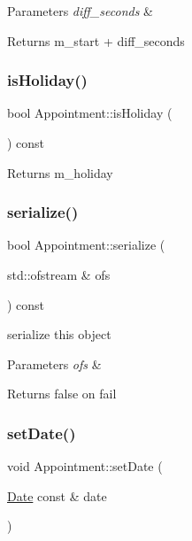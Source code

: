 \begin{DoxyParams}{Parameters}
{\em diff\+\_\+seconds} & \\
\hline
\end{DoxyParams}
\begin{DoxyReturn}{Returns}
m\+\_\+start + diff\+\_\+seconds 
\end{DoxyReturn}
\mbox{\label{classAppointment_a0307e814d106ba2b2314a28a9701efae}} 
\subsubsection{\texorpdfstring{is\+Holiday()}{isHoliday()}}
{\footnotesize\ttfamily bool Appointment\+::is\+Holiday (\begin{DoxyParamCaption}{ }\end{DoxyParamCaption}) const}

\begin{DoxyReturn}{Returns}
m\+\_\+holiday 
\end{DoxyReturn}
\mbox{\label{classAppointment_a2542a8dd24e926a2531f1d88bbf4dd88}} 
\subsubsection{\texorpdfstring{serialize()}{serialize()}}
{\footnotesize\ttfamily bool Appointment\+::serialize (\begin{DoxyParamCaption}\item[{std\+::ofstream \&}]{ofs }\end{DoxyParamCaption}) const}

serialize this object 
\begin{DoxyParams}{Parameters}
{\em ofs} & \\
\hline
\end{DoxyParams}
\begin{DoxyReturn}{Returns}
false on fail 
\end{DoxyReturn}
\mbox{\label{classAppointment_a0a69e652f7d3fa5091330a92479749a6}} 
\subsubsection{\texorpdfstring{set\+Date()}{setDate()}}
{\footnotesize\ttfamily void Appointment\+::set\+Date (\begin{DoxyParamCaption}\item[{\hyperlink{classDate}{Date} const \&}]{date }\end{DoxyParamCaption})}

